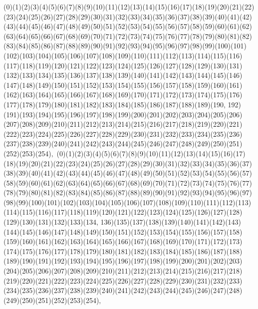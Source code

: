 \documentclass[12pt]{article}
\begin{document}
{(0)(1)(2)(3)(4)(5)(6)(7)(8)(9)(10)(11)(12)(13)(14)(15)(16)(17)(18)(19)(20)(21)(22)(23)(24)(25)(26)(27)(28)(29)(30)(31)(32)(33)(34)(35)(36)(37)(38)(39)(40)(41)(42)(43)(44)(45)(46)(47)(48)(49)(50)(51)(52)(53)(54)(55)(56)(57)(58)(59)(60)(61)(62)(63)(64)(65)(66)(67)(68)(69)(70)(71)(72)(73)(74)(75)(76)(77)(78)(79)(80)(81)(82)(83)(84)(85)(86)(87)(88)(89)(90)(91)(92)(93)(94)(95)(96)(97)(98)(99)(100)(101)(102)(103)(104)(105)(106)(107)(108)(109)(110)(111)(112)(113)(114)(115)(116)(117)(118)(119)(120)(121)(122)(123)(124)(125)(126)(127)(128)(129)(130)(131)(132)(133)(134)(135)(136)(137)(138)(139)(140)(141)(142)(143)(144)(145)(146)(147)(148)(149)(150)(151)(152)(153)(154)(155)(156)(157)(158)(159)(160)(161)(162)(163)(164)(165)(166)(167)(168)(169)(170)(171)(172)(173)(174)(175)(176)(177)(178)(179)(180)(181)(182)(183)(184)(185)(186)(187)(188)(189)(190, 192)(191)(193)(194)(195)(196)(197)(198)(199)(200)(201)(202)(203)(204)(205)(206)(207)(208)(209)(210)(211)(212)(213)(214)(215)(216)(217)(218)(219)(220)(221)(222)(223)(224)(225)(226)(227)(228)(229)(230)(231)(232)(233)(234)(235)(236)(237)(238)(239)(240)(241)(242)(243)(244)(245)(246)(247)(248)(249)(250)(251)(252)(253)(254)$
, 
$
(0)(1)(2)(3)(4)(5)(6)(7)(8)(9)(10)(11)(12)(13)(14)(15)(16)(17)(18)(19)(20)(21)(22)(23)(24)(25)(26)(27)(28)(29)(30)(31)(32)(33)(34)(35)(36)(37)(38)(39)(40)(41)(42)(43)(44)(45)(46)(47)(48)(49)(50)(51)(52)(53)(54)(55)(56)(57)(58)(59)(60)(61)(62)(63)(64)(65)(66)(67)(68)(69)(70)(71)(72)(73)(74)(75)(76)(77)(78)(79)(80)(81)(82)(83)(84)(85)(86)(87)(88)(89)(90)(91)(92)(93)(94)(95)(96)(97)(98)(99)(100)(101)(102)(103)(104)(105)(106)(107)(108)(109)(110)(111)(112)(113)(114)(115)(116)(117)(118)(119)(120)(121)(122)(123)(124)(125)(126)(127)(128)(129)(130)(131)(132)(133)(134, 136)(135)(137)(138)(139)(140)(141)(142)(143)(144)(145)(146)(147)(148)(149)(150)(151)(152)(153)(154)(155)(156)(157)(158)(159)(160)(161)(162)(163)(164)(165)(166)(167)(168)(169)(170)(171)(172)(173)(174)(175)(176)(177)(178)(179)(180)(181)(182)(183)(184)(185)(186)(187)(188)(189)(190)(191)(192)(193)(194)(195)(196)(197)(198)(199)(200)(201)(202)(203)(204)(205)(206)(207)(208)(209)(210)(211)(212)(213)(214)(215)(216)(217)(218)(219)(220)(221)(222)(223)(224)(225)(226)(227)(228)(229)(230)(231)(232)(233)(234)(235)(236)(237)(238)(239)(240)(241)(242)(243)(244)(245)(246)(247)(248)(249)(250)(251)(252)(253)(254)$
, 
$
}
\end{document}
